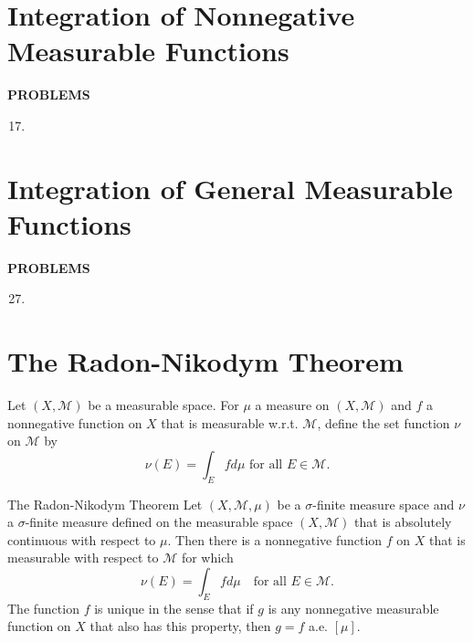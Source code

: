 \section{Integration of Nonnegative Measurable Functions}
\begin{center}
	\textbf{PROBLEMS}
\end{center}
\begin{enumerate}
	\setcounter{enumi}{16}
    \item 
\end{enumerate}

\section{Integration of General Measurable Functions}
\begin{center}
	\textbf{PROBLEMS}
\end{center}
\begin{enumerate}
	\setcounter{enumi}{26}
    \item 
\end{enumerate}

\section{The Radon-Nikodym Theorem}
Let $(X,\mathcal{M})$ be a measurable space.
For $\mu$ a measure on $(X,\mathcal{M})$ and $f$ a nonnegative function on $X$ that is measurable w.r.t. $\mathcal{M}$, define the set function $\nu$ on $\mathcal{M}$ by
\[
    \nu(E)=\int_Efd\mu\text{ for all }E\in\mathcal{M}.
\]

\begin{namedthm*}{The Radon-Nikodym Theorem}
    Let $(X,\mathcal{M},\mu)$ be a $\sigma$-finite measure space and $\nu$ a $\sigma$-finite measure defined on the measurable space $(X,\mathcal{M})$ that is absolutely continuous with respect to $\mu$.
    Then there is a nonnegative function $f$ on $X$ that is measurable with respect to $\mathcal{M}$ for which 
    \[
        \nu(E)=\int_Efd\mu\quad\text{for all }E\in\mathcal{M}.
    \]
    The function $f$ is unique in the sense that if $g$ is any nonnegative measurable function on $X$ that also has this property, then $g=f$ a.e. $[\mu]$.
\end{namedthm*}

